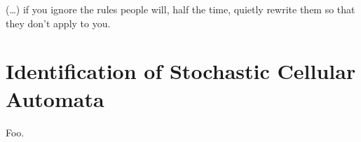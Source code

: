 
\begin{savequote}[99mm]
(\ldots) if you ignore the rules people will, half the time, quietly rewrite them so that they don't apply to you.
\end{savequote}

\chapter{Identification of Stochastic Cellular Automata}\label{chap:identify-sca}
Foo.


